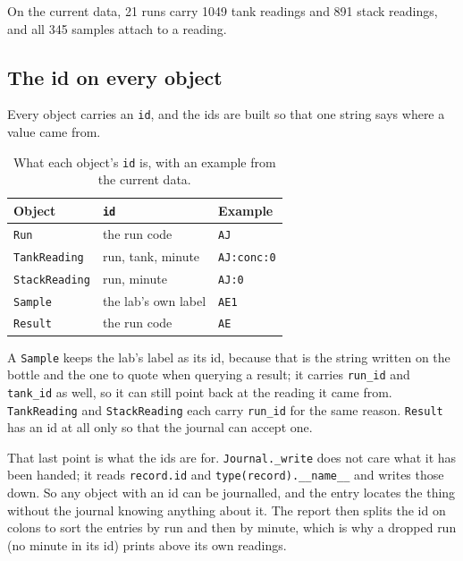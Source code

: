 On the current data, 21 runs carry 1049 tank readings and 891 stack readings, and all 345
samples attach to a reading.

\subsection{The id on every object}

Every object carries an \texttt{id}, and the ids are built so that one string says where a
value came from.

\begin{table}[htbp]
  \centering
  \caption{What each object's \texttt{id} is, with an example from the current data.}
  \label{tab:ids}
  \begin{tabular}{@{}lll@{}}
    \toprule
    Object & \texttt{id} & Example \\
    \midrule
    \texttt{Run}          & the run code                          & \texttt{AJ} \\
    \texttt{TankReading}  & run, tank, minute                     & \texttt{AJ:conc:0} \\
    \texttt{StackReading} & run, minute                           & \texttt{AJ:0} \\
    \texttt{Sample}       & the lab's own label                   & \texttt{AE1} \\
    \texttt{Result}       & the run code                          & \texttt{AE} \\
    \bottomrule
  \end{tabular}
\end{table}

A \texttt{Sample} keeps the lab's label as its id, because that is the string written on the
bottle and the one to quote when querying a result; it carries \texttt{run\_id} and
\texttt{tank\_id} as well, so it can still point back at the reading it came from.
\texttt{TankReading} and \texttt{StackReading} each carry \texttt{run\_id} for the same reason.
\texttt{Result} has an id at all only so that the journal can accept one.

That last point is what the ids are for. \texttt{Journal.\_write} does not care what it has been
handed; it reads \texttt{record.id} and \texttt{type(record).\_\_name\_\_} and writes those down.
So any object with an id can be journalled, and the entry locates the thing without the journal
knowing anything about it. The report then splits the id on colons to sort the entries by run
and then by minute, which is why a dropped run (no minute in its id) prints above its own
readings.

